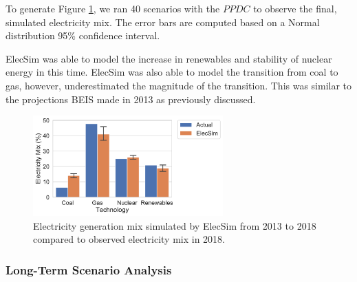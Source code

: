 To generate Figure \ref{fig:uk_validated_results_2018}, we ran 40 scenarios with the $PPDC$ to observe the final, simulated electricity mix. The error bars are computed based on a Normal distribution 95\% confidence interval.

ElecSim was able to model the increase in renewables and stability of nuclear energy in this time. ElecSim was also able to model the transition from coal to gas, however, underestimated the magnitude of the transition. This was similar to the projections BEIS made in 2013 as previously discussed.

\begin{figure}
	\centering
	\includegraphics[width=0.65\textwidth]{Chapter4/figures/e-Energy-2020/results/best_run_coal_dropout_95_ci.pdf}
	\caption{Electricity generation mix simulated by ElecSim from 2013 to 2018 compared to observed electricity mix in 2018.}
	\label{fig:uk_validated_results_2018}
\end{figure}







\subsubsection{Long-Term Scenario Analysis}

